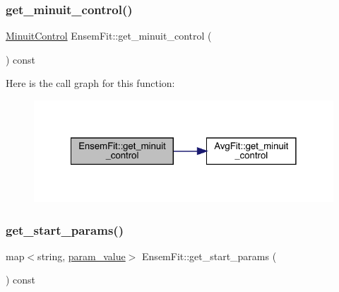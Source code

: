 \subsubsection{\texorpdfstring{get\_minuit\_control()}{get\_minuit\_control()}\hspace{0.1cm}{\footnotesize\ttfamily [2/2]}}
{\footnotesize\ttfamily \mbox{\hyperlink{structMinuitControl}{Minuit\+Control}} Ensem\+Fit\+::get\+\_\+minuit\+\_\+control (\begin{DoxyParamCaption}{ }\end{DoxyParamCaption}) const\hspace{0.3cm}{\ttfamily [inline]}}

Here is the call graph for this function\+:
\nopagebreak
\begin{figure}[H]
\begin{center}
\leavevmode
\includegraphics[width=322pt]{dc/dae/classEnsemFit_a47405314215c4adc9420af46dd5d9572_cgraph}
\end{center}
\end{figure}
\mbox{\label{classEnsemFit_a24424685749c260b1db4e63e34de74ae}} 
\subsubsection{\texorpdfstring{get\_start\_params()}{get\_start\_params()}\hspace{0.1cm}{\footnotesize\ttfamily [1/2]}}
{\footnotesize\ttfamily map$<$string, \mbox{\hyperlink{structparam__value}{param\+\_\+value}}$>$ Ensem\+Fit\+::get\+\_\+start\+\_\+params (\begin{DoxyParamCaption}{ }\end{DoxyParamCaption}) const\hspace{0.3cm}{\ttfamily [inline]}}

